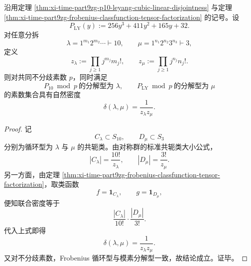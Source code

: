 \begin{theorem}\label{thm:xi-time-part9zg-p10-leyang-joint-splitting-partition-density-table}
沿用定理 \ref{thm:xi-time-part9zg-p10-leyang-cubic-linear-disjointness} 与定理 \ref{thm:xi-time-part9zg-frobenius-classfunction-tensor-factorization} 的记号。设
\[
P_{\mathrm{LY}}(y):=256y^3+411y^2+165y+32.
\]
对任意分拆
\[
\lambda=1^{m_1}2^{m_2}\cdots\vdash 10,
\qquad
\mu=1^{n_1}2^{n_2}3^{n_3}\vdash 3,
\]
定义
\[
z_\lambda:=\prod_{j\ge 1}j^{m_j}m_j!,
\qquad
z_\mu:=\prod_{j\ge 1}j^{n_j}n_j!.
\]
则对共同不分歧素数 \(p\)，同时满足
\[
P_{10}\bmod p\ \text{的分解型为 }\lambda,
\qquad
P_{\mathrm{LY}}\bmod p\ \text{的分解型为 }\mu
\]
的素数集合具有自然密度
\[
\boxed{\;
\delta(\lambda,\mu)=\frac{1}{z_\lambda z_\mu}.\;}
\]
\end{theorem}
\begin{proof}
记
\[
C_\lambda\subset S_{10},
\qquad
D_\mu\subset S_3
\]
分别为循环型为 \(\lambda\) 与 \(\mu\) 的共轭类。由对称群的标准共轭类大小公式，
\[
|C_\lambda|=\frac{10!}{z_\lambda},
\qquad
|D_\mu|=\frac{3!}{z_\mu}.
\]
另一方面，由定理 \ref{thm:xi-time-part9zg-frobenius-classfunction-tensor-factorization}，取类函数
\[
f=\mathbf 1_{C_\lambda},
\qquad
g=\mathbf 1_{D_\mu},
\]
便知联合密度等于
\[
\frac{|C_\lambda|}{10!}\cdot \frac{|D_\mu|}{3!}.
\]
代入上式即得
\[
\delta(\lambda,\mu)=\frac{1}{z_\lambda z_\mu}.
\]
又对不分歧素数，Frobenius 循环型与模素分解型一致，故结论成立。证毕。
\end{proof}

